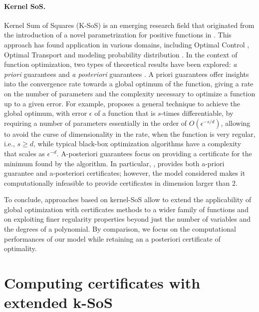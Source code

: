 \documentclass{article}
\begin{document}
\paragraph{Kernel SoS.}
Kernel Sum of Squares (K-SoS) is an emerging research field that originated from the introduction of a novel parametrization for positive functions in \cite{marteau-fereyNonparametricModelsNonnegative2020}. This approach has found application in various domains, including Optimal Control \cite{berthierInfiniteDimensionalSumsofSquaresOptimal2022}, Optimal Transport \cite{muzellecNearoptimalEstimationSmooth2021} and modeling probability distribution \cite{rudiPSDRepresentationsEffective2021}. In the context of function optimization, two types of theoretical results have been explored: \emph{a priori} guarantees \cite{rudiFindingGlobalMinima2020} and \emph{a posteriori} guarantees \cite{woodworthNonConvexOptimizationCertificates2022}. A priori guarantees offer insights into the convergence rate towards a global optimum of the function, giving a rate on the number of parameters and the complexity necessary to optimize a function up to a given error. For example, \cite{rudiFindingGlobalMinima2020} proposes a general technique to achieve the global optimum, with error $\epsilon$ of a function that is $s$-times differentiable, by requiring a number of parameters essentially in the order of $O(\epsilon^{-s/d})$, allowing to avoid the curse of dimensionality in the rate, when the function is very regular, i.e., $s \geq d$, while typical black-box optimization algorithms have a complexity that scales as $\epsilon^{-d}$. A-posteriori guarantees focus on providing a certificate for the minimum found by the algorithm. In particular, \cite{woodworthNonConvexOptimizationCertificates2022}, provides both a-priori guarantee and a-posteriori certificates; however, the model considered makes it computationally infeasible to provide certificates in dimension larger than $2$.

To conclude, approaches based on kernel-SoS allow to extend the applicability of global optimization with certificates methods to a wider family of functions and on exploiting finer regularity properties beyond just the number of variables and the degrees of a polynomial. By comparison, we focus on the computational performances of our model while retaining an a posteriori certificate of optimality.

\section{Computing certificates with extended k-SoS}
\end{document}

